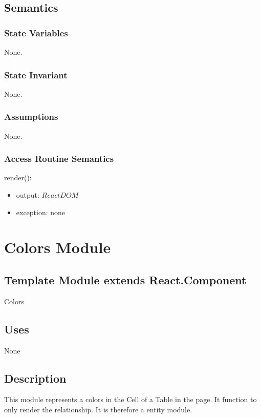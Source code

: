 \documentclass[12pt, titlepage]{article}
\begin{document}
\subsection{Semantics}

\subsubsection{State Variables}

None.

\subsubsection{State Invariant}

None.

\subsubsection{Assumptions}

None.

\subsubsection{Access Routine Semantics}

\noindent render():
\begin{itemize}
\item output: $ReactDOM$
\item exception: none
\end{itemize}

\section{Colors Module}

\subsection{Template Module extends React.Component}

Colors

\subsection{Uses}

None

\subsection{Description}
This module represents a colors in the Cell of a Table in the page. It function to only render the relationship. It is therefore a entity module.
\end{document}
